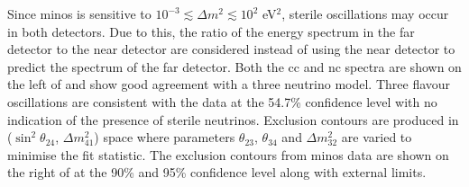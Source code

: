 Since \gls{minos} is sensitive to $10^{-3} \lesssim \Delta m^2 \lesssim 10^2$ eV$^2$, sterile oscillations may occur in both detectors. Due to this, the ratio of the energy spectrum in the far detector to the near detector are considered instead of using the near detector to predict the spectrum of the far detector. Both the \gls{cc} and \gls{nc} spectra are shown on the left of  and show good agreement with a three neutrino model. Three flavour oscillations are consistent with the data at the 54.7\% confidence level with no indication of the presence of sterile neutrinos. Exclusion contours are produced in ($\sin^2{\theta_{24}}$, $\Delta m^2_{41}$) space where parameters $\theta_{23}$, $\theta_{34}$ and $\Delta m^2_{32}$ are varied to minimise the fit statistic. The exclusion contours from \gls{minos} data are shown on the right of  at the 90\% and 95\% confidence level along with external limits. 

